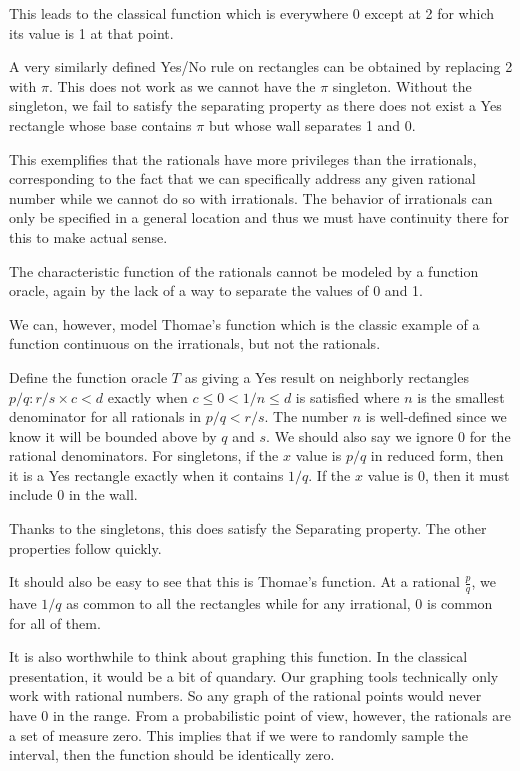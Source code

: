 \documentclass[12pt]{article}
\theoremstyle{remark}
\begin{document}
This leads to the classical function which is everywhere 0 except at 2 for which its value is 1 at that point. 

A very similarly defined Yes/No rule on rectangles can be obtained by replacing 2 with $\pi$. This does not work as we cannot have the $\pi$ singleton. Without the singleton, we fail to satisfy the separating property as there does not exist a Yes rectangle whose base contains $\pi$ but whose wall separates 1 and 0.  

This exemplifies that the rationals have more privileges than the irrationals, corresponding to the fact that we can specifically address any given rational number while we cannot do so with irrationals. The behavior of irrationals can only be specified in a general location and thus we must have continuity there for this to make actual sense. 

The characteristic function of the rationals cannot be modeled by a function oracle, again by the lack of a way to separate the values of 0 and 1. 

We can, however, model Thomae's function which is the classic example of a function continuous on the irrationals, but not the rationals. 

Define the function oracle $T$ as giving a Yes result on neighborly rectangles $p/q : r/s \times c\lt d$ exactly when $c \leq 0 \lt 1/n \leq d$ is satisfied where $n$ is the smallest denominator for all rationals in $p/q \lt r/s$. The number $n$ is well-defined since we know it will be bounded above by $q$ and $s$.  We should also say we ignore $0$ for the rational denominators. For singletons, if the $x$ value is $p/q$ in reduced form, then it is a Yes rectangle exactly when it contains $1/q$. If the $x$ value is $0$, then it must include $0$ in the wall.

Thanks to the singletons, this does satisfy the Separating property. The other properties follow quickly. 

It should also be easy to see that this is Thomae's function. At a rational $\frac{p}{q}$, we have $1/q$ as common to all the rectangles while for any irrational, $0$ is common for all of them. 

It is also worthwhile to think about graphing this function. In the classical presentation, it would be a bit of quandary. Our graphing tools technically only work with rational numbers. So any graph of the rational points would never have 0 in the range. From a probabilistic point of view, however, the rationals are a set of measure zero. This implies that if we were to randomly sample the interval, then the function should be identically zero. 
\end{document}
